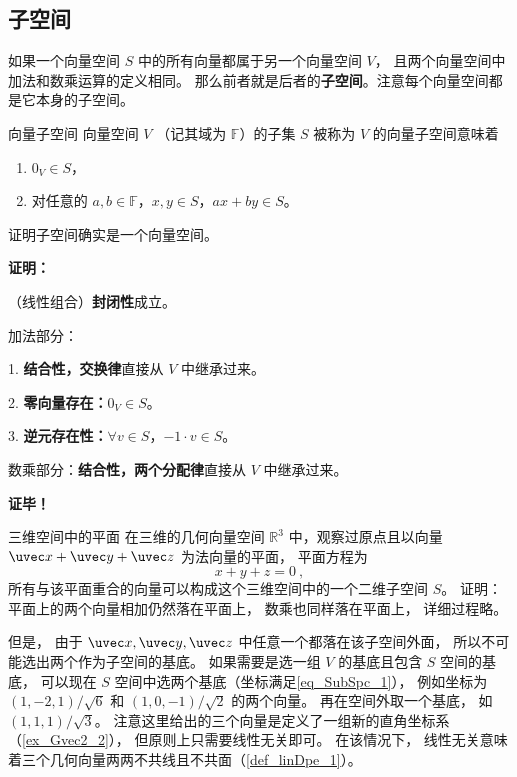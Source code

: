 
\begin{issues}
\issueDraft
\end{issues}


\subsection{子空间}

\cite{柯代数学引论}如果一个向量空间 $S$ 中的所有向量都属于另一个向量空间 $V$， 且两个向量空间中加法和数乘运算的定义相同。 那么前者就是后者的\textbf{子空间}。注意每个向量空间都是它本身的子空间。

\begin{definition}{向量子空间}
向量空间 $V$ （记其域为 $\mathbb{F}$）的子集 $S$ 被称为 $V$ 的向量子空间意味着
\begin{enumerate}
\item $0_V \in S$，
\item 对任意的 $a, b \in \mathbb{F}$，$x, y \in S$，$a x + b y \in S$。
\end{enumerate}
\end{definition}

\begin{theorem}{}
证明子空间确实是一个向量空间。
\end{theorem}
\textbf{证明：}

（线性组合）\textbf{封闭性}成立。 

加法部分：

1. \textbf{结合性，交换律}直接从 $V$ 中继承过来。

2. \textbf{零向量存在：}$0_V \in S$。

3. \textbf{逆元存在性：}$\forall v \in S$，$-1 \cdot v \in S$。

数乘部分：\textbf{结合性，两个分配律}直接从 $V$ 中继承过来。

\textbf{证毕！}

\begin{example}{三维空间中的平面}
在三维的几何向量空间 $\mathbb{R}^3$ 中，观察过原点且以向量 $\uvec x + \uvec y + \uvec z$ 为法向量的平面， 平面方程为
\begin{equation}\label{eq_SubSpc_1}
x + y + z = 0~,
\end{equation}
所有与该平面重合的向量可以构成这个三维空间中的一个二维子空间 $S$。 证明： 平面上的两个向量相加仍然落在平面上， 数乘也同样落在平面上， 详细过程略。 

但是， 由于 $\uvec x, \uvec y, \uvec z$ 中任意一个都落在该子空间外面， 所以不可能选出两个作为子空间的基底。 如果需要是选一组 $V$ 的基底且包含 $S$ 空间的基底， 可以现在 $S$ 空间中选两个基底（坐标满足\autoref{eq_SubSpc_1}）， 例如坐标为 $(1, -2, 1)/\sqrt{6}$ 和 $(1, 0, -1)/\sqrt{2}$ 的两个向量。 再在空间外取一个基底， 如 $(1, 1, 1)/\sqrt{3}$。 注意这里给出的三个向量是定义了一组新的直角坐标系（\autoref{ex_Gvec2_2}）， 但原则上只需要线性无关即可。 在该情况下， 线性无关意味着三个几何向量两两不共线且不共面（\autoref{def_linDpe_1}）。
\end{example}

